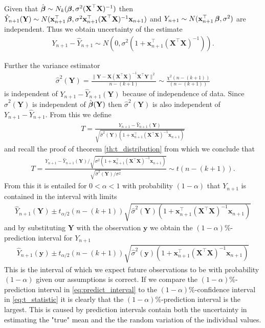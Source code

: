 Given that $\hat{\operatorname{\boldsymbol{\beta}}} \sim N_k(\operatorname{\boldsymbol{\beta}},\sigma^2(\textbf{X}^\top\textbf{X})^{-1})$ then $\hat{Y}_{n+1}(\textbf{Y})\sim N(\textbf{x}^\top_{n+1}\operatorname{\boldsymbol{\beta}},\sigma^2\textbf{x}^\top_{n+1}(\textbf{X}^\top\textbf{X})^{-1}\textbf{x}_{n+1})$ and $Y_{n+1}\sim N(\textbf{x}^\top_{n+1}\operatorname{\boldsymbol{\beta}},\sigma^2)$ are independent. Thus we obtain uncertainty of the estimate
\begin{align*}
    Y_{n+1}-\hat{Y}_{n+1} \sim N(0, \sigma^2(1+\textbf{x}^\top_{n+1}(\textbf{X}^\top\textbf{X})^{-1})).
\end{align*}

Further the variance estimator
\begin{align*}
    \hat{\sigma}^2(\textbf{Y})=\frac{\|\textbf{Y} - \textbf{X}( \textbf{X}^\top\textbf{X} )^{-1}\textbf{X}^\top\textbf{Y}\|^2}{n-(k+1)} \sim \frac{\chi^2(n-(k+1))}{(n-(k+1))}
\end{align*}
is independent of $Y_{n+1}-\hat{Y}_{n+1}(\textbf{Y})$ because of independence of data. Since $\hat{\sigma}^2(\textbf{Y})$ is independent of $\hat{\operatorname{\boldsymbol{\beta}}}(\textbf{Y})$ then $\hat{\sigma}^2(\textbf{Y})$ is also independent of $Y_{n+1}-\hat{Y}_{n+1}$. From this we define
\begin{align*}
    T=\frac{Y_{n+1}-\hat{Y}_{n+1}(\textbf{Y})}{\sqrt{\hat{\sigma}^2(\textbf{Y})(1+\textbf{x}^\top_{n+1}(\textbf{X}^\top\textbf{X})^{-1}\textbf{x}_{n+1})}}
\end{align*}
and recall the proof of theorem \ref{th:t_distribution} from which we conclude that
\begin{align*}
    T=\frac{Y_{n+1}-\hat{Y}_{n+1}(\textbf{Y})/\sqrt{\sigma^2(1+\textbf{x}^\top_{n+1}(\textbf{X}^\top\textbf{X})^{-1}\textbf{x}_{n+1})}}{\sqrt{\hat{\sigma}^2(\textbf{Y})/\sigma^2}} \sim t(n-(k+1)).
\end{align*}
From this it is entailed for $0<\alpha<1$ with probability $(1-\alpha)$ that $Y_{n+1}$ is contained in the interval with limits
\begin{align*}
    \hat{Y}_{n+1}(\textbf{Y})\pm t_{\alpha/2}(n-(k+1))\sqrt{\hat{\sigma}^2(\textbf{Y})(1+\textbf{x}^\top_{n+1}(\textbf{X}^\top\textbf{X})^{-1}\textbf{x}_{n+1})}
\end{align*}
and by substituting $\textbf{Y}$ with the observation $\textbf{y}$ we obtain the $(1-\alpha)\%$-prediction interval for $Y_{n+1}$
\begin{align} \label{eq:predict_interval}
    \hat{Y}_{n+1}(\textbf{y})\pm t_{\alpha/2}(n-(k+1))\sqrt{\hat{\sigma}^2(\textbf{y})(1+\textbf{x}^\top_{n+1}(\textbf{X}^\top\textbf{X})^{-1}\textbf{x}_{n+1})}
\end{align}
This is the interval of which we expect future observations to be with probability $(1-\alpha)$ given our assumptions is correct.
If we compare the $(1-\alpha)\%$-prediction interval in \eqref{eq:predict_interval} to the $(1-\alpha)\%$-confidence interval in \eqref{eq:t_statistic} it is clearly that the $(1-\alpha)\%$-prediction interval is the largest.
This is caused by prediction intervals contain both the uncertainty in estimating the "true" mean and the the random variation of the individual values.

